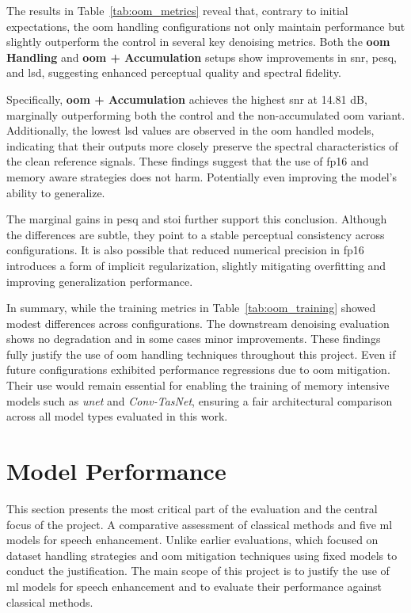 The results in Table~\ref{tab:oom_metrics} reveal that, contrary to initial expectations, the \gls{oom} handling configurations not only maintain performance but slightly outperform the control in several key denoising metrics. Both the \textbf{\gls{oom} Handling} and \textbf{\gls{oom} + Accumulation} setups show improvements in \gls{snr}, \gls{pesq}, and \gls{lsd}, suggesting enhanced perceptual quality and spectral fidelity.

Specifically, \textbf{\gls{oom} + Accumulation} achieves the highest \gls{snr} at 14.81 dB, marginally outperforming both the control and the non-accumulated \gls{oom} variant. Additionally, the lowest \gls{lsd} values are observed in the \gls{oom} handled models, indicating that their outputs more closely preserve the spectral characteristics of the clean reference signals. These findings suggest that the use of \gls{fp16} and memory aware strategies does not harm. Potentially even improving the model's ability to generalize. 

The marginal gains in \gls{pesq} and \gls{stoi} further support this conclusion. Although the differences are subtle, they point to a stable perceptual consistency across configurations. It is also possible that reduced numerical precision in \gls{fp16} introduces a form of implicit regularization, slightly mitigating overfitting and improving generalization performance.

In summary, while the training metrics in Table~\ref{tab:oom_training} showed modest differences across configurations. The downstream denoising evaluation shows no degradation and in some cases minor improvements. These findings fully justify the use of \gls{oom} handling techniques throughout this project. Even if future configurations exhibited performance regressions due to \gls{oom} mitigation. Their use would remain essential for enabling the training of memory intensive models such as \textit{\gls{unet}} and \textit{Conv-TasNet}, ensuring a fair architectural comparison across all model types evaluated in this work.

\section{Model Performance}
\label{sec:model_performance}

This section presents the most critical part of the evaluation and the central focus of the project. A comparative assessment of classical methods and five \gls{ml} models for speech enhancement. Unlike earlier evaluations, which focused on dataset handling strategies and \gls{oom} mitigation techniques using fixed models to conduct the justification. The main scope of this project is to justify the use of \gls{ml} models for speech enhancement and to evaluate their performance against classical methods.

